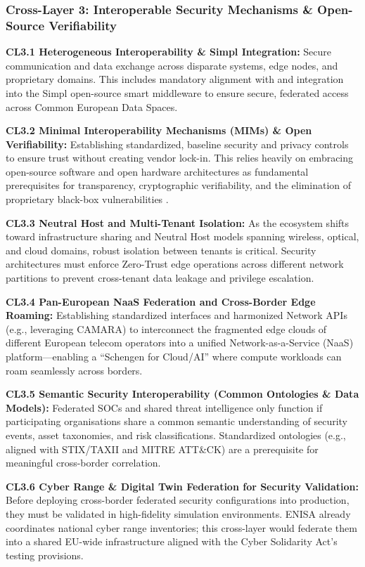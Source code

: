 \documentclass[12pt,a4paper]{article}
\begin{document}
\subsubsection*{Cross-Layer 3: Interoperable Security Mechanisms \& Open-Source Verifiability}
\textbf{CL3.1 Heterogeneous Interoperability \& Simpl Integration:} Secure communication and data exchange across disparate systems, edge nodes, and proprietary domains. This includes mandatory alignment with and integration into the Simpl open-source smart middleware \cite{cloud_edge_roadmap} to ensure secure, federated access across Common European Data Spaces.

\textbf{CL3.2 Minimal Interoperability Mechanisms (MIMs) \& Open Verifiability:} Establishing standardized, baseline security and privacy controls to ensure trust without creating vendor lock-in. This relies heavily on embracing open-source software and open hardware architectures as fundamental prerequisites for transparency, cryptographic verifiability, and the elimination of proprietary black-box vulnerabilities \cite{cloud_edge_roadmap}.

\textbf{CL3.3 Neutral Host and Multi-Tenant Isolation:} As the ecosystem shifts toward infrastructure sharing and Neutral Host models spanning wireless, optical, and cloud domains, robust isolation between tenants is critical. Security architectures must enforce Zero-Trust edge operations across different network partitions to prevent cross-tenant data leakage and privilege escalation.

\textbf{CL3.4 Pan-European NaaS Federation and Cross-Border Edge Roaming:} Establishing standardized interfaces and harmonized Network APIs (e.g., leveraging CAMARA) to interconnect the fragmented edge clouds of different European telecom operators into a unified Network-as-a-Service (NaaS) platform---enabling a ``Schengen for Cloud/AI'' where compute workloads can roam seamlessly across borders.

\textbf{CL3.5 Semantic Security Interoperability (Common Ontologies \& Data Models):} Federated SOCs and shared threat intelligence only function if participating organisations share a common semantic understanding of security events, asset taxonomies, and risk classifications. Standardized ontologies (e.g., aligned with STIX/TAXII and MITRE ATT\&CK) are a prerequisite for meaningful cross-border correlation.

\textbf{CL3.6 Cyber Range \& Digital Twin Federation for Security Validation:} Before deploying cross-border federated security configurations into production, they must be validated in high-fidelity simulation environments. ENISA already coordinates national cyber range inventories; this cross-layer would federate them into a shared EU-wide infrastructure aligned with the Cyber Solidarity Act's testing provisions.
\end{document}
